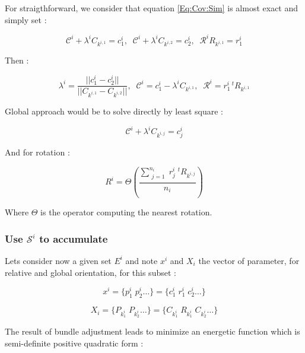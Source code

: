 For straigthforward, we consider that equation \ref{Eq:Cov:Sim} is almost exact and simply set :

\begin{equation}
  \mathcal{C}^i + \lambda^i C_{k^{i,1}}   = c^i_1 , \;\;
  \mathcal{C}^i + \lambda^i C_{k^{i,2}}   = c^i_2 , \;\;
  \mathcal{R}^i R_{k^{i,1}} = r^i_1
\end{equation}

Then :

\begin{equation}
    \lambda^i = \frac{||c^i_1-c^i_2||}{||C_{k^{i,1}} - C_{k^{i,2}}||} , \;\;
     \mathcal{C}^i = c^i_1 -\lambda^i C_{k^{i,1}} , \;\;
     \mathcal{R}^i  = r^i_1   \,  ^t R_{k^{i,1}}
\end{equation}

Global approach would be to solve directly by least square :

\begin{equation}
   \mathcal{C}^i + \lambda^i C_{k^{i,j}}   = c^i_j 
\end{equation}

And for rotation :

\begin{equation}
    R^i  = \Theta(   \frac{\sum \limits_{\substack{j=1 }}^{n_i}  r^i_j   \;  ^t R_{k^{i,j}}}{n_i})
\end{equation}

Where $\Theta$ is the operator computing the nearest rotation.


\subsubsection{Use $ \mathcal{S}^i$ to accumulate}

Lets  consider now a given set $E^i$ and note $x^i $ and $X_i$ the vector of parameter, 
for relative and global orientation, for this subset  :

\begin{equation}
    x^i = \{p^i_1 \; p^i_2  \dots\} = \{c^i_1 \;  r^i_1 \; c^i_2  \dots \}
\end{equation}

\begin{equation}
    X_i = \{P_{k^i_1} \; P_{k^i_2}  \dots\} = \{C_{k^i_1} \;  R_{k^i_1} \; C_{k^i_2}  \dots \}
\end{equation}

The result of bundle adjustment  leads to minimize an energetic function 
which is semi-definite positive quadratic form :

